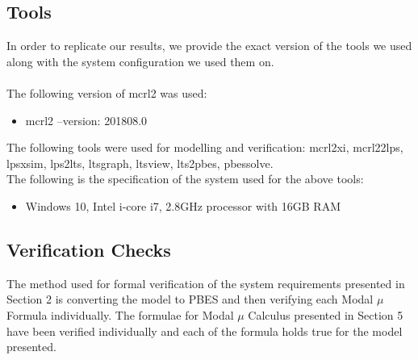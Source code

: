 \documentclass[a4paper,12pt]{article}
\begin{document}
	\subsection{Tools}
	In order to replicate our results, we provide the exact version of the tools we used along with the system configuration we used them on.
	\\
	\\The following version of mcrl2 was used:
	\begin{itemize}
		\item mcrl2 --version: 201808.0
	\end{itemize}
	The following tools were used for modelling and verification: mcrl2xi, mcrl22lps, lpsxsim, lps2lts, ltsgraph, ltsview, lts2pbes, pbessolve.
	\\The following is the specification of the system used for the above tools:
	\begin{itemize}
		\item Windows 10, Intel i-core i7, 2.8GHz processor with 16GB RAM 
	\end{itemize}
	\subsection{Verification Checks}
	The method used for formal verification of the system requirements presented in Section 2 is converting the model to PBES and then verifying each Modal $\mu$ Formula individually. The formulae for Modal $\mu$ Calculus presented in Section 5 have been verified individually and each of the formula holds true for the model presented.
\end{document}

